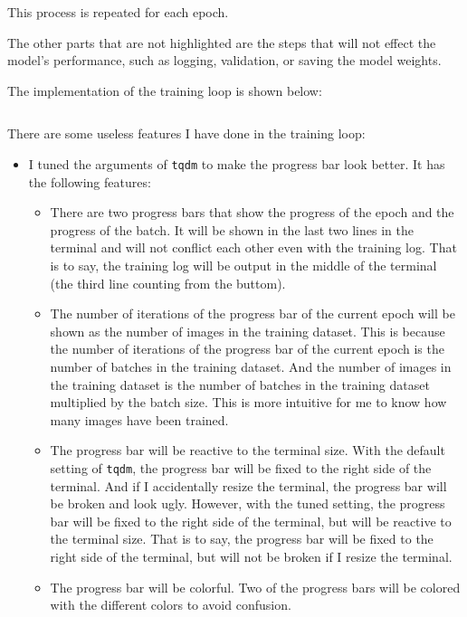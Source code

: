 This process is repeated for each epoch.

The other parts that are not highlighted are the steps that will not effect the model's performance, such as logging, validation, or saving the model weights.

The implementation of the training loop is shown below:

\inputminted[firstline=22, lastline=108, highlightlines={46,58,67-71,81-84}]{python}{../src/train.py}

There are some useless features I have done in the training loop:
\begin{itemize}
    \item I tuned the arguments of \texttt{tqdm} to make the progress bar look better.
          It has the following features:
          \begin{itemize}
              \item There are two progress bars that show the progress of the epoch and the progress of the batch.
                    It will be shown in the last two lines in the terminal and will not conflict each other even with the training log.
                    That is to say, the training log will be output in the middle of the terminal (the third line counting from the buttom).
              \item The number of iterations of the progress bar of the current epoch will be shown as the number of images in the training dataset.
                    This is because the number of iterations of the progress bar of the current epoch is the number of batches in the training dataset.
                    And the number of images in the training dataset is the number of batches in the training dataset multiplied by the batch size.
                    This is more intuitive for me to know how many images have been trained.
              \item The progress bar will be reactive to the terminal size.
                    With the default setting of \texttt{tqdm}, the progress bar will be fixed to the right side of the terminal.
                    And if I accidentally resize the terminal, the progress bar will be broken and look ugly.
                    However, with the tuned setting, the progress bar will be fixed to the right side of the terminal, but will be reactive to the terminal size.
                    That is to say, the progress bar will be fixed to the right side of the terminal, but will not be broken if I resize the terminal.
              \item The progress bar will be colorful. Two of the progress bars will be colored with the different colors to avoid confusion.
          \end{itemize}
\end{itemize}

